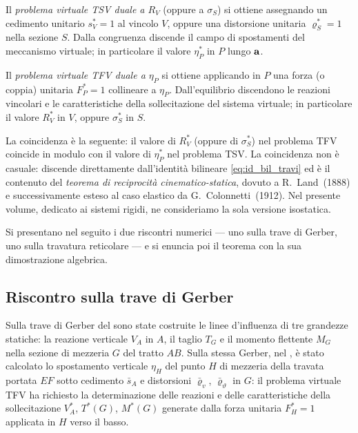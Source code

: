 Il \emph{problema virtuale TSV duale a $R_V$} (oppure a 
$\sigma_S$) si ottiene assegnando un cedimento unitario 
$s^{*}_V=1$ al vincolo $V$, oppure una distorsione unitaria 
$\varrho^{*}_S=1$ nella sezione $S$. Dalla congruenza discende 
il campo di spostamenti del meccanismo virtuale; in particolare 
il valore $\eta^{*}_P$ in $P$ lungo $\mathbf{a}$.

Il \emph{problema virtuale TFV duale a $\eta_P$} si ottiene 
applicando in $P$ una forza (o coppia) unitaria $F^{*}_P=1$ 
collineare a $\eta_P$. Dall'equilibrio discendono le reazioni 
vincolari e le caratteristiche della sollecitazione del sistema 
virtuale; in particolare il valore $R^{*}_V$ in $V$, oppure 
$\sigma^{*}_S$ in $S$.

La coincidenza è la seguente: il valore di $R^{*}_V$ (oppure di 
$\sigma^{*}_S$) nel problema TFV coincide in modulo con il valore 
di $\eta^{*}_P$ nel problema TSV. La coincidenza non è casuale: 
discende direttamente dall'identità bilineare 
\eqref{eq:id_bil_travi} ed è il contenuto del \emph{teorema di 
	reciprocità cinematico-statica}, dovuto a R.~Land~(1888) e 
successivamente esteso al caso elastico da G.~Colonnetti~(1912). 
Nel presente volume, dedicato ai sistemi rigidi, ne consideriamo 
la sola versione isostatica.

Si presentano nel seguito i due riscontri numerici --- uno sulla 
trave di Gerber, uno sulla travatura reticolare --- e si enuncia 
poi il teorema con la sua dimostrazione algebrica.

\subsection*{Riscontro sulla trave di Gerber}

Sulla trave di Gerber del  sono state 
costruite le linee d'influenza di tre grandezze statiche: la 
reazione verticale $V_A$ in $A$, il taglio $T_G$ e il momento 
flettente $M_G$ nella sezione di mezzeria $G$ del tratto $AB$. 
Sulla stessa Gerber, nel , è stato 
calcolato lo spostamento verticale $\eta_H$ del punto $H$ di 
mezzeria della travata portata $EF$ sotto cedimento $\bar s_A$ 
e distorsioni $\bar\varrho_v$, $\bar\varrho_\vartheta$ in $G$: 
il problema virtuale TFV ha richiesto la determinazione delle 
reazioni e delle caratteristiche della sollecitazione $V_A^{*}$, 
$T^{*}(G)$, $M^{*}(G)$ generate dalla forza unitaria $F^{*}_H=1$ 
applicata in $H$ verso il basso.

